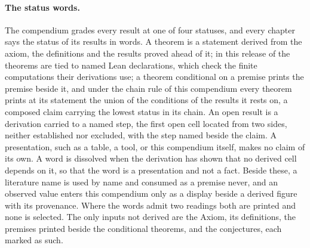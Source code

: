 \paragraph{The status words.} The compendium grades every result at one of four statuses, and every chapter says the status of its results in words. A theorem is a statement derived from the axiom, the definitions and the results proved ahead of it; in this release \atlasTheoremsLean{} of the \atlasTheorems{} theorems are tied to named Lean declarations, which check the finite computations their derivations use; a theorem conditional on a premise prints the premise beside it, and under the chain rule of this compendium every theorem prints at its statement the union of the conditions of the results it rests on, a composed claim carrying the lowest status in its chain. An open result is a derivation carried to a named step, the first open cell located from two sides, neither established nor excluded, with the step named beside the claim. A presentation, such as a table, a tool, or this compendium itself, makes no claim of its own. A word is dissolved when the derivation has shown that no derived cell depends on it, so that the word is a presentation and not a fact. Beside these, a literature name is used by name and consumed as a premise never, and an observed value enters this compendium only as a display beside a derived figure with its provenance. Where the words admit two readings both are printed and none is selected. The only inputs not derived are the Axiom, its definitions, the premises printed beside the conditional theorems, and the conjectures, each marked as such.

